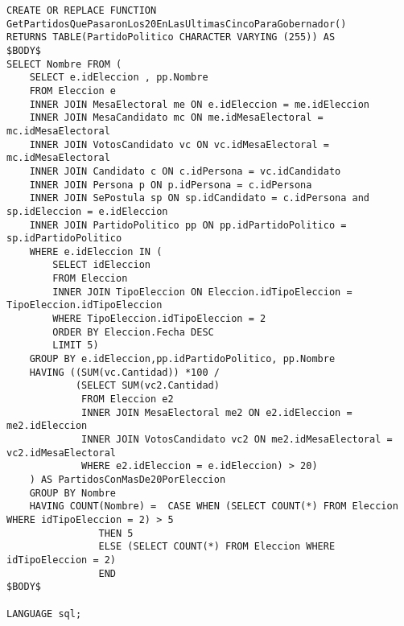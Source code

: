 \begin{verbatim}
CREATE OR REPLACE FUNCTION GetPartidosQuePasaronLos20EnLasUltimasCincoParaGobernador()
RETURNS TABLE(PartidoPolitico CHARACTER VARYING (255)) AS
$BODY$
SELECT Nombre FROM (
    SELECT e.idEleccion , pp.Nombre
    FROM Eleccion e
    INNER JOIN MesaElectoral me ON e.idEleccion = me.idEleccion
    INNER JOIN MesaCandidato mc ON me.idMesaElectoral = mc.idMesaElectoral
    INNER JOIN VotosCandidato vc ON vc.idMesaElectoral = mc.idMesaElectoral
    INNER JOIN Candidato c ON c.idPersona = vc.idCandidato 
    INNER JOIN Persona p ON p.idPersona = c.idPersona
    INNER JOIN SePostula sp ON sp.idCandidato = c.idPersona and sp.idEleccion = e.idEleccion
    INNER JOIN PartidoPolitico pp ON pp.idPartidoPolitico = sp.idPartidoPolitico
    WHERE e.idEleccion IN (
        SELECT idEleccion
        FROM Eleccion 
        INNER JOIN TipoEleccion ON Eleccion.idTipoEleccion = TipoEleccion.idTipoEleccion
        WHERE TipoEleccion.idTipoEleccion = 2
        ORDER BY Eleccion.Fecha DESC
        LIMIT 5)
    GROUP BY e.idEleccion,pp.idPartidoPolitico, pp.Nombre
    HAVING ((SUM(vc.Cantidad)) *100 /
            (SELECT SUM(vc2.Cantidad) 
             FROM Eleccion e2 
             INNER JOIN MesaElectoral me2 ON e2.idEleccion = me2.idEleccion
             INNER JOIN VotosCandidato vc2 ON me2.idMesaElectoral = vc2.idMesaElectoral
             WHERE e2.idEleccion = e.idEleccion) > 20)
    ) AS PartidosConMasDe20PorEleccion
    GROUP BY Nombre
    HAVING COUNT(Nombre) =  CASE WHEN (SELECT COUNT(*) FROM Eleccion WHERE idTipoEleccion = 2) > 5 
                THEN 5 
                ELSE (SELECT COUNT(*) FROM Eleccion WHERE idTipoEleccion = 2)
                END  
$BODY$

LANGUAGE sql;

\end{verbatim}
